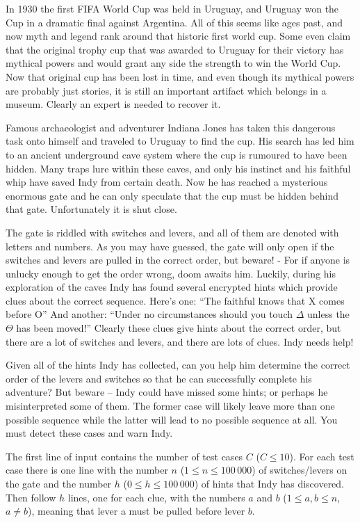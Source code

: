 In 1930 the first FIFA World Cup was held in Uruguay, and Uruguay won the Cup in a dramatic final against Argentina.
All of this seems like ages past, and now myth and legend rank around that historic first world cup.
Some even claim that the original trophy cup that was awarded to Uruguay for their victory has mythical powers and would grant any side the strength to win the World Cup.
Now that original cup has been lost in time, and even though its mythical powers are probably just stories, it is still an important artifact which belongs in a museum.
Clearly an expert is needed to recover it.

Famous archaeologist and adventurer Indiana Jones has taken this dangerous task onto himself and traveled to Uruguay to find the cup.
His search has led him to an ancient underground cave system where the cup is rumoured to have been hidden.
Many traps lure within these caves, and only his instinct and his faithful whip have saved Indy from certain death.
Now he has reached a mysterious enormous gate and he can only speculate that the cup must be hidden behind that gate.
Unfortunately it is shut close.

The gate is riddled with switches and levers, and all of them are denoted with letters and numbers.
As you may have guessed, the gate will only open if the switches and levers are pulled in the correct order, but beware!
- For if anyone is unlucky enough to get the order wrong, doom awaits him.
Luckily, during his exploration of the caves Indy has found several encrypted hints which provide clues about the correct sequence.
Here's one: ``The faithful knows that X comes before O''
And another: ``Under no circumstances should you touch $\Delta$ unless the $\Theta$ has been moved!''
Clearly these clues give hints about the correct order, but there are a lot of switches and levers, and there are lots of clues.
Indy needs help!

Given all of the hints Indy has collected, can you help him determine the correct order of the levers and switches so that he can successfully complete his adventure?
But beware -- Indy could have missed some hints;
or perhaps he misinterpreted some of them.
The former case will likely leave more than one possible sequence while the latter will lead to no possible sequence at all.
You must detect these cases and warn Indy.

\begin{Input}
    The first line of input contains the number of test cases $C$ ($C \leq 10$).
    For each test case there is one line with the number $n$ ($1 \leq n \leq 100\,000$) of switches/levers on the gate and the number $h$ ($0 \leq h \leq 100\,000$) of hints that Indy has discovered.
    Then follow $h$ lines, one for each clue, with the numbers $a$ and $b$ ($1 \leq a, b \leq n$, $a \neq b$), meaning that lever a must be pulled before lever $b$.
\end{Input}

